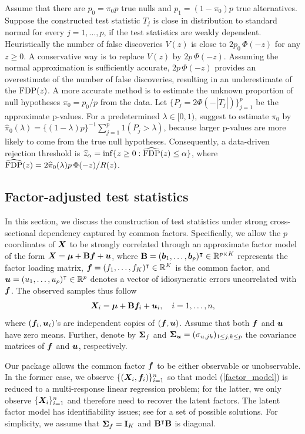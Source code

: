 Assume that there are $p_0=\pi_0p$ true nulls and $p_1=(1-\pi_0)p$ true alternatives. Suppose the constructed test statistic $T_j$ is close in distribution to standard normal for every $j=1,\ldots, p$, if the test statistics are weakly dependent. Heuristically the number of false discoveries $V(z)$ is close to $2 p_0 \, \Phi(-z)$ for any $z\geq 0$.
A conservative way is to replace $V(z)$ by $2p\, \Phi(-z)$. Assuming the normal approximation is sufficiently accurate, $2p\, \Phi(-z)$ provides an overestimate of the number of false discoveries, resulting in an underestimate of the $  {\rm FDP}(z)$. A more accurate method is to estimate the unknown proportion of null hypotheses $\pi_0 = p_0/p$ from the data. Let $\{  P_j = 2\Phi(-| T_j | ) \}_{j=1}^p$ be the approximate p-values. For a predetermined $\lambda \in [0,1)$, \cite{S2002} suggest to estimate $\pi_0$ by  $	\hat{\pi}_0(\lambda) =  \{ (1-\lambda)p\}^{-1}\sum_{j=1}^p 1 ( P_j  > \lambda  )$,
because larger p-values are more likely to  come from  the true null hypotheses.
Consequently, a data-driven rejection threshold is $\widehat z_\alpha = \inf \{ z\geq 0 : \widehat {{\rm FDP}}(z) \leq  \alpha  \}$, where $\widehat {{\rm FDP}}(z) = 2 \widehat{\pi}_0(\lambda)  p \, \Phi(-z) / R(z)$.


\subsection{Factor-adjusted test statistics}
In this section, we discuss the construction of test statistics under strong cross-sectional dependency captured by common factors.
Specifically, we allow the $p$ coordinates of $\bm{X}$ to be strongly correlated through an approximate factor model of the form $\bm{X}    = \bm{\mu} + \mathbf{B} \bm f + \bm{u}$, where $\mathbf{B} = (\bm{b}_1, \ldots, \bm{b}_p)^\intercal \in \mathbb{R}^{p\times K}$ represents the factor loading matrix, $\bm f =(f_1 ,\ldots, f_K )^\intercal  \in \mathbb{R}^K$ is the common factor, and $\bm{u} = (u_1  , \ldots, u_p )^\intercal \in \mathbb{R}^p$ denotes a vector of idiosyncratic errors uncorrelated with $\bm f$. The observed samples thus follow
\begin{equation}\label{factor_model}
  \bm{X}_i   = \bm{\mu} + \mathbf{B} \bm f_i + \bm{u}_i, ~~~ i=1, \ldots , n,
\end{equation}	
where $(\bm f_i, \bm{u}_i)$'s are independent copies of $(\bm f, \bm{u})$. Assume that both $\bm f $ and $\bm{u}$ have zero means.
Further, denote by $\bm{\Sigma}_f$ and $\bm{\Sigma}_{\bm{u}}=(\sigma_{u, jk})_{1\leq  j, k\leq p}$ the  covariance matrices of $\bm f$ and $\bm{u}$, respectively.

Our package allows the common factor $\bm f$ to be either observable or unobservable. In the former case, we observe  $\{ ( \bm{X}_i, \bm f_i ) \}_{i=1}^n$ so that model (\ref{factor_model}) is reduced to a multi-response linear regression problem; for the latter, we only observe $\{\bm{X}_i \}_{i=1}^n$ and therefore need to recover the latent factors. The latent factor model has identifiability issues; see \cite{BL2012} for a set of possible solutions. For simplicity, we assume that $\bm{\Sigma}_f = \mathbf{I}_K$ and $\mathbf{B}^\intercal \mathbf{B} \nonumber$ is diagonal.


